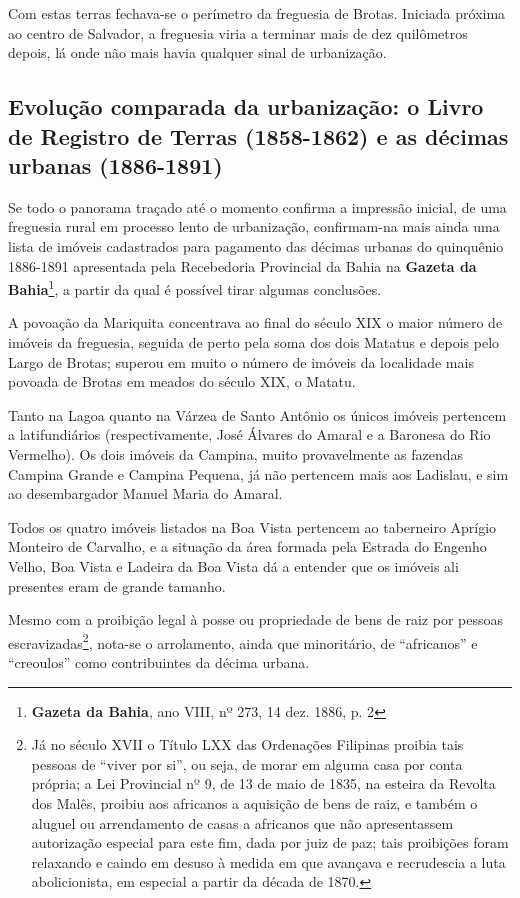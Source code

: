 Com estas terras fechava-se o perímetro da freguesia de Brotas. Iniciada próxima ao centro de Salvador, a freguesia viria a terminar mais de dez quilômetros depois, lá onde não mais havia qualquer sinal de urbanização.

\subsection{Evolução comparada da urbanização: o Livro de Registro de Terras (1858-1862) e as décimas urbanas (1886-1891)}

Se todo o panorama traçado até o momento confirma a impressão inicial, de uma freguesia rural em processo lento de urbanização, confirmam-na mais ainda uma lista de imóveis cadastrados para pagamento das décimas urbanas do quinquênio 1886-1891 apresentada pela Recebedoria Provincial da Bahia na \textbf{Gazeta da Bahia}\footnote{\textbf{Gazeta da Bahia}, ano VIII, nº 273, 14 dez. 1886, p. 2}, a partir da qual é possível tirar algumas conclusões.



A povoação da Mariquita concentrava ao final do século XIX o maior número de imóveis da freguesia, seguida de perto pela soma dos dois Matatus e depois pelo Largo de Brotas; superou em muito o número de imóveis da localidade mais povoada de Brotas em meados do século XIX, o Matatu.

Tanto na Lagoa quanto na Várzea de Santo Antônio os únicos imóveis pertencem a latifundiários (respectivamente, José Álvares do Amaral e a Baronesa do Rio Vermelho). Os dois imóveis da Campina, muito provavelmente as fazendas Campina Grande e Campina Pequena, já não pertencem mais aos Ladislau, e sim ao desembargador Manuel Maria do Amaral.

Todos os quatro imóveis listados na Boa Vista pertencem ao taberneiro Aprígio Monteiro de Carvalho, e a situação da área formada pela Estrada do Engenho Velho, Boa Vista e Ladeira da Boa Vista dá a entender que os imóveis ali presentes eram de grande tamanho.

Mesmo com a proibição legal à posse ou propriedade de bens de raiz por pessoas escravizadas\footnote{Já no século XVII o Título LXX das Ordenações Filipinas proibia tais pessoas de ``viver por si'', ou seja, de morar em alguma casa por conta própria; a Lei Provincial nº 9, de 13 de maio de 1835, na esteira da Revolta dos Malês, proibiu aos africanos a aquisição de bens de raiz, e também o aluguel ou arrendamento de casas a africanos que não apresentassem autorização especial para este fim, dada por juiz de paz; tais proibições foram relaxando e caindo em desuso à medida em que avançava e recrudescia a luta abolicionista, em especial a partir da década de 1870.}, nota-se o arrolamento, ainda que minoritário, de ``africanos'' e ``creoulos'' como contribuintes da décima urbana.

